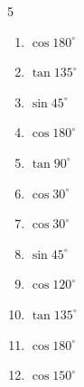 \begin{multicols}{5}
\begin{enumerate}

  \item $\displaystyle \cos{180^\circ}$

        \phantom{$\displaystyle =-1$}

  \item $\displaystyle \tan{135^\circ}$

        \phantom{$\displaystyle =-1$}

  \item $\displaystyle \sin{45^\circ}$


  \item $\displaystyle \cos{180^\circ}$

        \phantom{$\displaystyle =-1$}

  \item $\displaystyle \tan{90^\circ}$

        \phantom{$\displaystyle なし$}

\columnbreak %

  \item $\displaystyle \cos{30^\circ}$


  \item $\displaystyle \cos{30^\circ}$


  \item $\displaystyle \sin{45^\circ}$


  \item $\displaystyle \cos{120^\circ}$


  \item $\displaystyle \tan{135^\circ}$

        \phantom{$\displaystyle =-1$}

  \item $\displaystyle \cos{180^\circ}$

        \phantom{$\displaystyle =-1$}

  \item $\displaystyle \cos{150^\circ}$



\end{enumerate}
\end{multicols}
